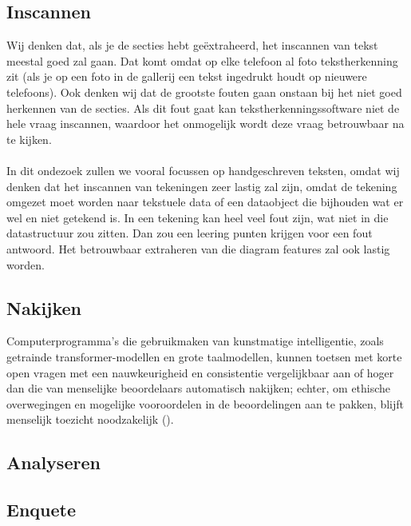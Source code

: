 \documentclass[12pt]{article}
\begin{document}
\subsection{Inscannen}
\begin{multicols}{2}
    
Wij denken dat, als je de secties hebt geëxtraheerd, het inscannen van tekst meestal goed zal gaan. Dat komt omdat op elke telefoon al foto tekstherkenning zit (als je op een foto in de gallerij een tekst ingedrukt houdt op nieuwere telefoons). Ook denken wij dat de grootste fouten gaan onstaan bij het niet goed herkennen van de secties. Als dit fout gaat kan tekstherkenningssoftware niet de hele vraag inscannen, waardoor het onmogelijk wordt deze vraag betrouwbaar na te kijken. \\\\
In dit ondezoek zullen we vooral focussen op handgeschreven teksten, omdat wij denken dat het inscannen van tekeningen zeer lastig zal zijn, omdat de tekening omgezet moet worden naar tekstuele data of een dataobject die bijhouden wat er wel en niet getekend is. In een tekening kan heel veel fout zijn, wat niet in die datastructuur zou zitten. Dan zou een leering punten krijgen voor een fout antwoord. Het betrouwbaar extraheren van die diagram features zal ook lastig worden.
\end{multicols}

\subsection{Nakijken}
\begin{multicols}{2}
Computerprogramma's die gebruikmaken van kunstmatige intelligentie, zoals getrainde transformer-modellen en grote taalmodellen, kunnen toetsen met korte open vragen met een nauwkeurigheid en consistentie vergelijkbaar aan of hoger dan die van menselijke beoordelaars automatisch nakijken; echter, om ethische overwegingen en mogelijke vooroordelen in de beoordelingen aan te pakken, blijft menselijk toezicht noodzakelijk (\cite{gobrecht2024humansubjectivityerrornovel, kumar2020scoredusingautosas, schneider2024llmbasedautogradingshorttextual}).
\end{multicols}
\subsection{Analyseren}

\subsection{Enquete}
\end{document}

